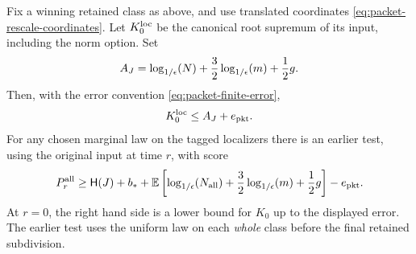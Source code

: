\begin{proposition}
\label{prop:local-root-comparison}
Fix a winning retained class as above, and use translated coordinates
\eqref{eq:packet-rescale-coordinates}.  Let \(K_0^{\rm loc}\) be the
canonical root supremum of its input, including the norm option.
Set
\begin{equation}
 A_J=\log_{1/\epsilon}\!\left(N\right)+\frac32\log_{1/\epsilon}\!\left(m\right)+\frac12g.
 \label{eq:packet-local-root-value}
\end{equation}
Then, with the error convention \eqref{eq:packet-finite-error},
\begin{equation}
 K_0^{\rm loc}\le A_J+e_{\rm pkt}.
 \label{eq:packet-local-root-upper}
\end{equation}
For any chosen marginal law on the tagged localizers there is an
earlier test, using the original input at time \(r\), with score
\begin{equation}
 P_r^{\rm all}\ge\mathsf H(J)+b_*+
 \mathbb E\left[\log_{1/\epsilon}\!\left(N_{\rm all}\right)+\frac32\log_{1/\epsilon}\!\left(m\right)+\frac12g\right]
 -e_{\rm pkt}.
 \label{eq:packet-earlier-whole-score}
\end{equation}
At \(r=0\), the right hand side is a lower bound for \(K_0\)
up to the displayed error.  The earlier test uses the uniform law
on each \emph{whole} class before the final retained subdivision.
\end{proposition}

